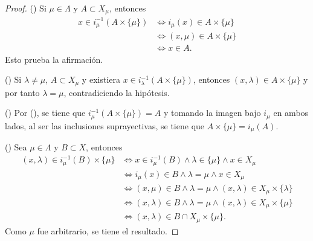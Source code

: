 \begin{proof}
({\scshape{}}) Si $\mu \in \Lambda$ y $A \subset X_{\mu}$, entonces
\begin{align*}
    x \in i^{-1}_{\mu}(A \times \{ \mu \}) & \iff i_{\mu}(x) \in A \times \{ \mu \} \\
                                           & \iff (x, \mu) \in A \times \{ \mu \} \\
                                           & \iff x \in A.
\end{align*}
Esto prueba la afirmación.
\bigskip

({\scshape{}}) Si $\lambda \ne \mu$, $A \subset X_{\mu}$ y existiera $x \in i^{-1}_{\lambda}(A \times \{ \mu \})$, entonces $(x,\lambda) \in A \times \{ \mu \}$ y por tanto $\lambda = \mu$, contradiciendo la hipótesis.
\bigskip

({\scshape{}}) Por ({\scshape{}}), se tiene que $i^{-1}_{\mu}(A \times \{ \mu \}) = A$ y tomando la imagen bajo $i_{\mu}$ en ambos lados, al ser las inclusiones suprayectivas, se tiene que $A \times \{ \mu \} = i_{\mu}(A)$.
\bigskip

({\scshape{}}) Sea $\mu \in \Lambda$ y $B \subset X$, entonces
\begin{align*}
    (x,\lambda) \in i^{-1}_{\mu}(B) \times \{ \mu \} & \iff x \in i^{-1}_{\mu}(B) \land \lambda \in \{ \mu \} \land x \in X_{\mu}  \\
                                                     & \iff i_{\mu}(x) \in B \land \lambda = \mu \land x \in X_{\mu} \\
                                                     & \iff (x,\mu) \in B \land \lambda = \mu \land (x, \lambda) \in X_{\mu} \times \{ \lambda \}  \\
                                                     & \iff (x,\lambda) \in B \land \lambda = \mu \land (x, \lambda) \in X_{\mu} \times \{ \mu \} \\
                                                     & \iff (x,\lambda) \in B \cap X_{\mu} \times \{ \mu \}.
\end{align*}
Como $\mu$ fue arbitrario, se tiene el resultado.
\end{proof}
